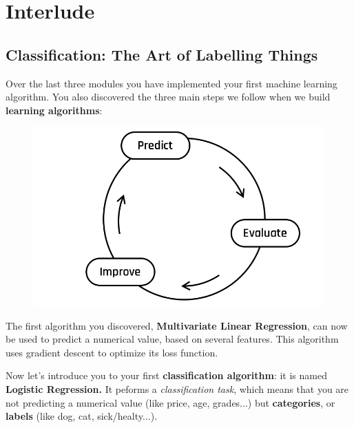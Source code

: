 
\section*{Interlude}
\subsection*{Classification: The Art of Labelling Things}
Over the last three modules you have implemented your first machine learning algorithm.
You also discovered the three main steps we follow when we build \textbf{learning algorithms}:

\begin{figure}[!h]
    \centering
    \includegraphics[scale=0.25]{assets/Default.png}
\end{figure}

The first algorithm you discovered, \textbf{Multivariate Linear Regression}, can now be used to predict a numerical value, based on several features.
This algorithm uses gradient descent to optimize its loss function.  

Now let's introduce you to your first \textbf{classification algorithm}: it is named \textbf{Logistic Regression.}
It peforms a \textit{classification task}, which means that you are not predicting a numerical value (like price, age, grades...) but \textbf{categories}, or \textbf{labels} (like dog, cat, sick/healty...).

